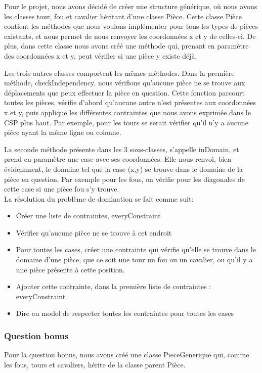 \documentclass{article}
\begin{document}
Pour le projet, nous avons décidé de créer une structure générique, où nous avons les classes tour, fou et cavalier héritant d'une classe Pièce. 
Cette classe Pièce contient les méthodes que nous voulons implémenter pour tous les types de pièces existants, et nous permet de nous renvoyer les coordonnées x et y de celles-ci. De plus, dans cette classe nous avons créé une méthode qui, prenant en paramètre des coordonnées x et y, peut vérifier si une pièce y existe déjà. 

Les trois autres classes comportent les mêmes méthodes. Dans la première méthode, checkIndependency, nous vérifions qu'aucune pièce ne se trouve aux déplacements que peux effectuer la pièce en question. Cette fonction parcourt toutes les pièces, vérifie d'abord qu'aucune autre n'est présentes aux coordonnées x et y, puis applique les différentes contraintes que nous avons exprimée dans le CSP plus haut. Par exemple, pour les tours se serait vérifier qu'il n'y a aucune pièce ayant la même ligne ou colonne. 

La seconde méthode présente dans les 3 sous-classes, s'appelle inDomain, et prend en paramètre une case avec ses coordonnées. Elle nous renvoi, bien évidemment, le domaine tel que la case (x,y) se trouve dans le domaine de la pièce en question. Par exemple pour les fous, on vérifie pour les diagonales de cette case si une pièce fou s'y trouve.\\

La résolution du problème de domination se fait comme suit: 
\begin{itemize}
\item Créer une liste de contraintes, everyConstraint
\item Vérifier qu'aucune pièce ne se trouve à cet endroit
\item Pour toutes les cases, créer une contrainte qui vérifie qu'elle se trouve dans le domaine d'une pièce, que ce soit une tour un fou ou un cavalier, ou qu'il y a une pièce présente à cette position.
\item Ajouter cette contrainte, dans la première liste de contraintes : everyConstraint
\item Dire au model de respecter toutes les contraintes pour toutes les cases
\end{itemize}

\subsubsection{Question bonus}
Pour la question bonus, nous avons créé une classe PieceGenerique qui, comme les fous, tours et cavaliers, hérite de la classe parent Pièce.\\
\end{document}
